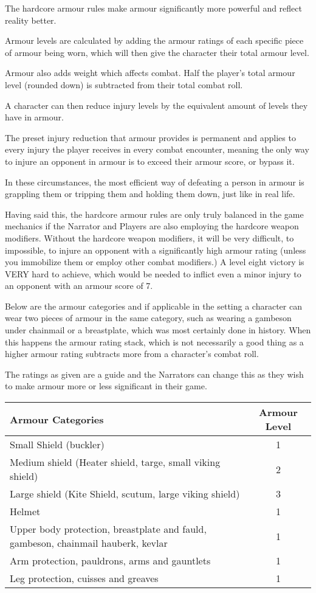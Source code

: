 The hardcore armour rules make armour significantly more powerful and reflect reality better.

Armour levels are calculated by adding the armour ratings of each specific piece of armour being worn, which will then give the character their total armour level.

Armour also adds weight which affects combat. Half the player's total armour level (rounded down) is subtracted from their total combat roll.

A character can then reduce injury levels by the equivalent amount of levels they have in armour.

The preset injury reduction that armour provides is permanent and applies to every injury the player receives in every combat encounter, meaning the only way to injure an opponent in armour is to exceed their armour score, or bypass it.

In these circumstances, the most efficient way of defeating a person in armour is grappling them or tripping them and holding them down, just like in real life.

Having said this, the hardcore armour rules are only truly balanced in the game mechanics if the Narrator and Players are also employing the hardcore weapon modifiers. Without the hardcore weapon modifiers, it will be very difficult, to impossible, to injure an opponent with a significantly high armour rating (unless you immobilize them or employ other combat modifiers.) A level eight victory is VERY hard to achieve, which would be needed to inflict even a minor injury to an opponent with an armour score of 7.

Below are the armour categories and if applicable in the setting a character can wear two pieces of armour in the same category, such as wearing a gambeson under chainmail or a breastplate, which was most certainly done in history. When this happens the armour rating stack, which is not necessarily a good thing as a higher armour rating subtracts more from a character’s combat roll.

The ratings as given are a guide and the Narrators can change this as they wish to make armour more or less significant in their game.

\begin{center}
    \begin{tabular}{|m{} c|} 
      \hline
      \textbf{Armour Categories} & \textbf{Armour Level} \\
      \hline
      Small Shield (buckler) & 1 \\
      Medium shield (Heater shield, targe, small viking shield) & 2 \\
      Large shield (Kite Shield, scutum, large viking shield) & 3 \\
      Helmet & 1 \\
      Upper body protection, breastplate and fauld, gambeson, chainmail hauberk, kevlar & 1 \\
      Arm protection, pauldrons, arms and gauntlets & 1 \\
      Leg protection, cuisses and greaves & 1 \\
      \hline
    \end{tabular}
\end{center}